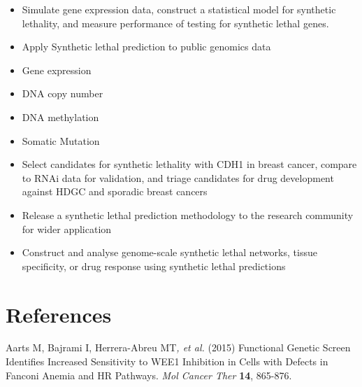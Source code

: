 \begin{itemize}

\item 

Simulate gene expression data, construct a statistical model for
synthetic lethality, and measure performance of testing for synthetic
lethal genes. 

\item 

Apply Synthetic lethal prediction to public genomics data



\item 

Gene expression

\item 

DNA copy number

\item 

DNA methylation

\item 

Somatic Mutation

\item 

Select candidates for synthetic lethality with CDH1 in breast cancer,
compare to RNAi data for validation, and triage candidates for drug
development against HDGC and sporadic breast cancers

\item 

Release a synthetic lethal prediction methodology to the research
community for wider application 

\item 

Construct and analyse genome-scale synthetic lethal networks, tissue
specificity, or drug response using synthetic lethal predictions

\end{itemize}

\clearpage\section{References}
A\hypertarget{ENREF1}{}arts M, Bajrami I, Herrera-Abreu MT\textit{, et
al.} (2015) Functional Genetic Screen Identifies Increased Sensitivity
to WEE1 Inhibition in Cells with Defects in Fanconi Anemia and HR
Pathways. \textit{Mol Cancer Ther} \textbf{14}, 865-876.



